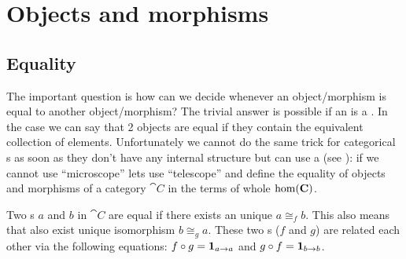 \chapter{Objects and morphisms}

\section{Equality}

The important question is how can we decide whenever an
object/morphism is equal to another object/morphism? The trivial
answer is possible if an  is a
. In the case we can say that 2 objects are equal
if they contain the equivalent collection of elements. Unfortunately
we cannot do the same trick for categorical s as
soon as they don't have any internal 
structure but can use a  (see 
): if we cannot use ``microscope'' lets
use ``telescope'' and define the equality of objects and morphisms of
a category $\cat{C}$ in the terms of whole $\mathrm{hom}(\mathbf{C})$.

\begin{definition}
\label{def:object_equality}
Two s $a$ and $b$ in 
$\cat{C}$ are equal if there exists an unique
 $a \cong_f b$. This also means that
also exist unique isomorphism $b \cong_g a$. These two
s ($f$ and $g$) are related each other via 
the following equations: $f \circ g = \mathbf{1}_{ a \to a }$ and $g \circ f
= \mathbf{1}_{ b \to b }$. 
\end{definition}

